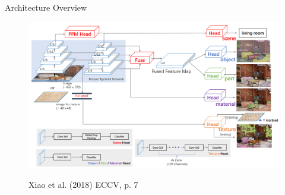 \documentclass{beamer}
\begin{document}

\begin{frame}{Architecture Overview}
    \begin{figure}
        \centering
        \includegraphics[width=\textwidth]{Images/UPerNetArchitectureOverview.png}

        \vspace{0.5em}
        {\tiny Xiao et al. (2018) ECCV, p. 7}
    \end{figure}
\end{frame}

\end{document}

